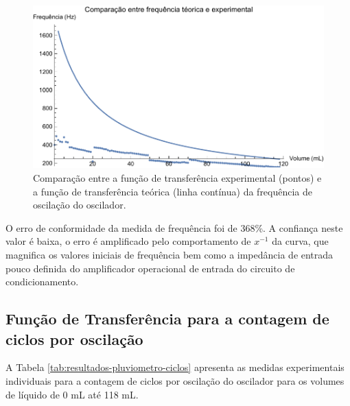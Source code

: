 \documentclass[a4paper]{instrumentacao}
\begin{document}
\begin{figure}[H]
	\centering \includegraphics[width=\textwidth]{Nivel/Experimental/Frequencia-Comparacao.pdf}
	\caption{Comparação entre a função de transferência experimental (pontos) e a função de transferência teórica (linha contínua) da frequência de oscilação do oscilador.}
	\label{fig:resultados-pluviometro-frequencia-comparacao}
\end{figure}

O erro de conformidade da medida de frequência foi de 368\%. A confiança neste valor é baixa, o erro é amplificado pelo comportamento de $x^{-1}$ da curva, que magnifica os valores iniciais de frequência bem como a impedância de entrada pouco definida do amplificador operacional de entrada do circuito de condicionamento.

\subsection{Função de Transferência para a contagem de ciclos por oscilação}

A Tabela \ref{tab:resultados-pluviometro-ciclos} apresenta as medidas experimentais individuais para a contagem de ciclos por oscilação do oscilador para os volumes de líquido de 0 mL até 118 mL.
\end{document}
